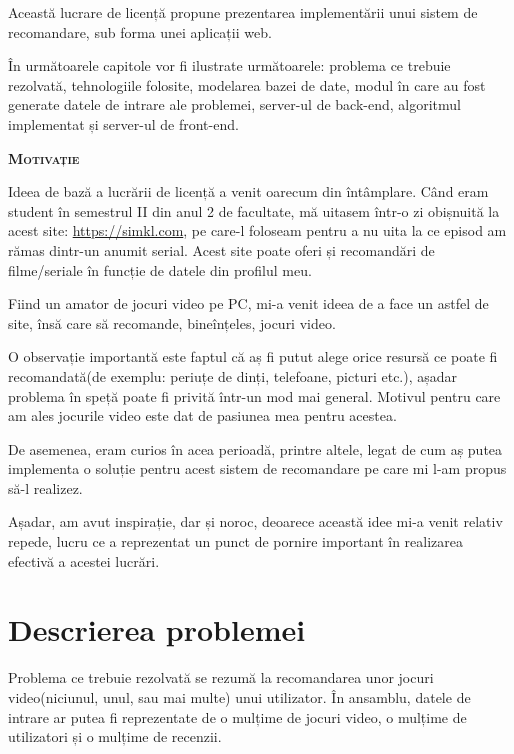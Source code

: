 \documentclass[12pt,a4paper]{report}
\begin{document}
	Această lucrare de licență propune prezentarea implementării unui sistem de recomandare, sub forma unei aplicații web.
	
	În următoarele capitole vor fi ilustrate următoarele: problema ce trebuie rezolvată, tehnologiile folosite, modelarea bazei de date, modul în care au fost generate datele de intrare ale problemei, server-ul de back-end, algoritmul implementat și server-ul de front-end.
	
	\begin{center}
	{\scshape\large \textbf{Motivație} \par}
	\end{center}

	Ideea de bază a lucrării de licență a venit oarecum din întâmplare. Când eram student în semestrul II din anul 2 de facultate, mă uitasem într-o zi obișnuită la acest site: \href{https://simkl.com/}{https://simkl.com}, pe care-l foloseam pentru a nu uita la ce episod am rămas dintr-un anumit serial. Acest site poate oferi și recomandări de filme/seriale în funcție de datele din profilul meu.
	
	Fiind un amator de jocuri video pe PC, mi-a venit ideea de a face un astfel de site, însă care să recomande, bineînțeles, jocuri video.
	
	O observație importantă este faptul că aș fi putut alege orice resursă ce poate fi recomandată(de exemplu: periuțe de dinți, telefoane, picturi etc.), așadar problema în speță poate fi privită într-un mod mai general. Motivul pentru care am ales jocurile video este dat de pasiunea mea pentru acestea.
	
	De asemenea, eram curios în acea perioadă, printre altele, legat de cum aș putea implementa o soluție pentru acest sistem de recomandare pe care mi l-am propus să-l realizez.
	
	Așadar, am avut inspirație, dar și noroc, deoarece această idee mi-a venit relativ repede, lucru ce a reprezentat un punct de pornire important în realizarea efectivă a acestei lucrări.
	
	\newpage
	
\setcounter{secnumdepth}{3} 
\renewcommand*\thesection{\arabic{section}}
\section{Descrierea problemei}

Problema ce trebuie rezolvată se rezumă la recomandarea unor jocuri video(niciunul, unul, sau mai multe) unui utilizator. În ansamblu, datele de intrare ar putea fi reprezentate de o mulțime de jocuri video, o mulțime de utilizatori și o mulțime de recenzii.
\end{document}
